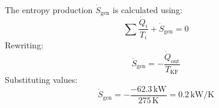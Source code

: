 The entropy production \( \dot{S}_{\text{gen}} \) is calculated using:  
\[
\sum \frac{\dot{Q}_i}{T_i} + \dot{S}_{\text{gen}} = 0
\]  
Rewriting:  
\[
\dot{S}_{\text{gen}} = -\frac{\dot{Q}_{\text{out}}}{T_{\text{KF}}}
\]  
Substituting values:  
\[
\dot{S}_{\text{gen}} = -\frac{-62.3 \, \text{kW}}{275 \, \text{K}} = 0.2 \, \text{kW/K}
\]